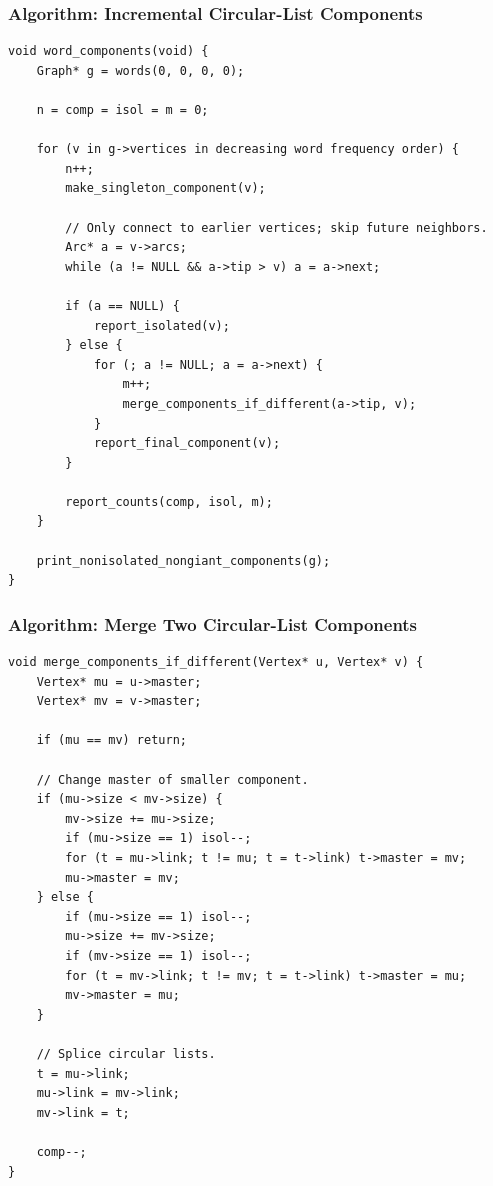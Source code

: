 \documentclass[11pt]{article}
\begin{document}
\subsubsection{Algorithm: Incremental Circular-List Components}\label{algorithm-incremental-circular-list-components}

\begin{verbatim}
void word_components(void) {
    Graph* g = words(0, 0, 0, 0);

    n = comp = isol = m = 0;

    for (v in g->vertices in decreasing word frequency order) {
        n++;
        make_singleton_component(v);

        // Only connect to earlier vertices; skip future neighbors.
        Arc* a = v->arcs;
        while (a != NULL && a->tip > v) a = a->next;

        if (a == NULL) {
            report_isolated(v);
        } else {
            for (; a != NULL; a = a->next) {
                m++;
                merge_components_if_different(a->tip, v);
            }
            report_final_component(v);
        }

        report_counts(comp, isol, m);
    }

    print_nonisolated_nongiant_components(g);
}
\end{verbatim}

\subsubsection{Algorithm: Merge Two Circular-List Components}\label{algorithm-merge-two-circular-list-components}

\begin{verbatim}
void merge_components_if_different(Vertex* u, Vertex* v) {
    Vertex* mu = u->master;
    Vertex* mv = v->master;

    if (mu == mv) return;

    // Change master of smaller component.
    if (mu->size < mv->size) {
        mv->size += mu->size;
        if (mu->size == 1) isol--;
        for (t = mu->link; t != mu; t = t->link) t->master = mv;
        mu->master = mv;
    } else {
        if (mu->size == 1) isol--;
        mu->size += mv->size;
        if (mv->size == 1) isol--;
        for (t = mv->link; t != mv; t = t->link) t->master = mu;
        mv->master = mu;
    }

    // Splice circular lists.
    t = mu->link;
    mu->link = mv->link;
    mv->link = t;

    comp--;
}
\end{verbatim}
\end{document}
